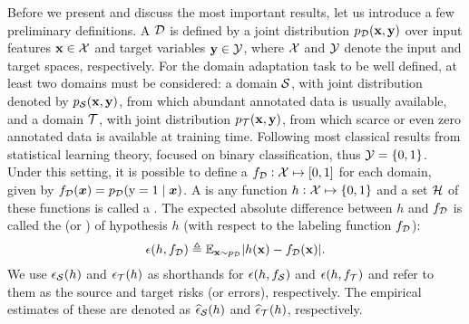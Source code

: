 Before we present and discuss the most important results, let us introduce a few preliminary definitions. A  ${\mathcal{D}}$ is defined by a joint distribution $p_{\mathcal{D}}({\mathbf{x}}, {\mathbf{y}})$ over input features ${\mathbf{x}} \in {\mathcal{X}}$ and target variables ${\mathbf{y}} \in {\mathcal{Y}}$, where ${\mathcal{X}}$ and ${\mathcal{Y}}$ denote the input and target spaces, respectively. For the domain adaptation task to be well defined, at least two domains must be considered: a  domain ${\mathcal{S}}$, with joint distribution denoted by $p_{\mathcal{S}}({\mathbf{x}}, {\mathbf{y}})$, from which abundant annotated data is usually available, and a  domain ${\mathcal{T}}$, with joint distribution $p_{\mathcal{T}}({\mathbf{x}}, {\mathbf{y}})$, from which scarce or even zero annotated data is available at training time. Following most classical results from statistical learning theory, \citet{BenDavid2010} focused on binary classification, thus ${\mathcal{Y}} = \{0, 1\}$. Under this setting, it is possible to define a  $f_{\mathcal{D}}: {\mathcal{X}} \mapsto [0, 1]$ for each domain, given by $f_{\mathcal{D}}({\bm{x}}) = p_{\mathcal{D}}({\textnormal{y}}=1 \mid {\bm{x}})$. A  is any function $h: {\mathcal{X}} \mapsto \{0,1\}$ and a set ${\mathcal{H}}$ of these functions is called a . The expected absolute difference between $h$ and $f_{\mathcal{D}}$ is called the  (or ) of hypothesis $h$ (with respect to the labeling function $f_{\mathcal{D}}$):
\begin{equation}
	\label{eq:risk}
	\epsilon(h,f_{\mathcal{D}}) \triangleq \mathbb{E}_{{\mathbf{x}} \sim p_{\mathcal{D}}} |h({\mathbf{x}}) - f_{\mathcal{D}}({\mathbf{x}})|.
\end{equation}
We use $\epsilon_{\mathcal{S}}(h)$ and $\epsilon_{\mathcal{T}}(h)$ as shorthands for $\epsilon(h,f_{\mathcal{S}})$ and $\epsilon(h,f_{\mathcal{T}})$ and refer to them as the source and target risks (or errors), respectively. The empirical estimates of these are denoted as $\widehat{\epsilon}_{\mathcal{S}}(h)$ and $\widehat{\epsilon}_{\mathcal{T}}(h)$, respectively.

